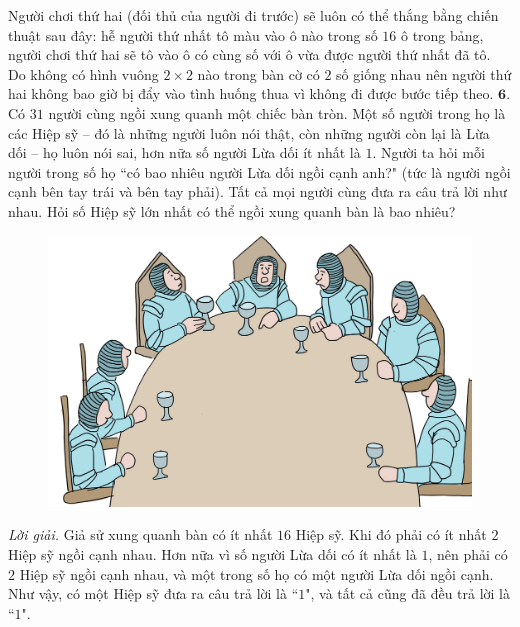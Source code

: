 \begin{multicols}{2}
\begin{figure}[H]
		\vspace*{-5pt}
	\end{figure}
	Người chơi thứ hai (đối thủ của người đi trước) sẽ luôn có thể thắng bằng chiến thuật sau đây: hễ người thứ nhất tô màu vào ô nào trong số $16$ ô trong bảng, người chơi thứ hai sẽ tô vào ô có cùng số với ô vừa được người thứ nhất đã tô. Do không có hình vuông $2\times2$ nào trong bàn cờ có $2$ số giống nhau nên người thứ hai không bao giờ bị đẩy vào tình huống thua vì không đi được bước tiếp theo.
	\vskip 0.1cm
	$\pmb{6.}$ Có $31$ người cùng ngồi xung quanh một chiếc bàn tròn. Một số người trong họ là các Hiệp sỹ -- đó là những người luôn nói thật, còn những người còn lại là Lừa dối -- họ luôn nói sai, hơn nữa số người Lừa dối ít nhất là $1$. Người ta hỏi mỗi người trong số họ ``có bao nhiêu người Lừa dối ngồi cạnh anh?" (tức là người ngồi cạnh bên tay trái và bên tay phải). Tất cả mọi người cùng đưa ra câu trả lời như nhau. Hỏi số Hiệp sỹ lớn nhất có thể ngồi xung quanh bàn là bao nhiêu?
	\begin{figure}[H]
		\vspace*{-5pt}
		\centering
		\captionsetup{labelformat= empty, justification=centering}
		\includegraphics[width= 1\linewidth]{bai6}
		\vspace*{-10pt}
	\end{figure}
	\textit{Lời giải.} Giả sử xung quanh bàn có ít nhất $16$ Hiệp sỹ. Khi đó phải có ít  nhất $2$ Hiệp sỹ ngồi cạnh nhau. Hơn nữa vì số người Lừa dối có ít nhất là $1$, nên phải có $2$ Hiệp sỹ ngồi cạnh nhau, và một trong số họ có một người Lừa dối ngồi cạnh. Như vậy, có một Hiệp sỹ đưa ra câu trả lời là ``$1$", và tất cả cũng đã đều trả lời là ``$1$".

\end{multicols}
